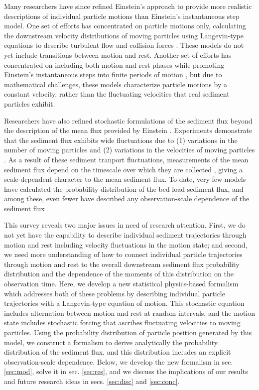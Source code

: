 Many researchers have since refined Einstein's approach to provide more realistic descriptions of individual particle motions than Einstein's instantaneous step model.
One set of efforts has concentrated on particle motions only, calculating the downstream velocity distributions of moving particles using Langevin-type equations to describe turbulent flow and collision forces \citep{Ancey2014,Fan2014,Pierce2021}. These models do not yet include transitions between motion and rest. 
Another set of efforts has concentrated on including both motion and rest phases while promoting Einstein's instantaneous steps into finite periods of motion \citep{Lisle1998,Lajeunesse2017,Pierce2020b}, but due to mathematical challenges, these models characterize particle motions by a constant velocity, rather than the fluctuating velocities that real sediment particles exhibit.

Researchers have also refined stochastic formulations of the sediment flux beyond the description of the mean flux provided by Einstein \citep{Furbish2012}. Experiments demonstrate that the sediment flux exhibits wide fluctuations due to (1) variations in the number of moving particles and (2) variations in the velocities of moving particles \citep{Ancey2008, Ancey2014}.
As a result of these sediment tranport fluctuations, measurements of the mean sediment flux depend on the timescale over which they are collected \citep{Saletti2014,Dhont2019,Singh2009}, giving a scale-dependent character to the mean sediment flux.
To date, very few models have calculated the probability distribution of the bed load sediment flux, and among these, even fewer have described any observation-scale dependence of the sediment flux \citep{Ancey2019}.

This survey reveals two major issues in need of research attention. First, we do not yet have the capability to describe individual sediment trajectories through motion and rest including velocity fluctuations in the motion state; and second, we need more understanding of how to connect individual particle trajectories through motion and rest to the overall downstream sediment flux probability distribution and the dependence of the moments of this distribution on the observation time.
Here, we develop a new statistical physics-based formalism which addresses both of these problems by describing individual particle trajectories with a Langevin-type equation of motion. 
This stochastic equation includes alternation between motion and rest at random intervals, and the motion state includes stochastic forcing that ascribes fluctuating velocities to moving particles.
Using the probability distribution of particle position generated by this model, we construct a formalism to derive analytically the probability distribution of the sediment flux, and this distribution includes an explicit observation-scale dependence.
Below, we develop the new formalism in sec. \ref{sec:mod}, solve it in sec. \ref{sec:res}, and we discuss the implications of our results and future research ideas in secs. \ref{sec:disc} and \ref{sec:conc}.

